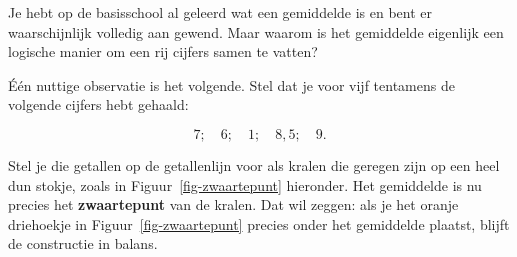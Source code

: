 \documentclass[
  a4paper,
]{scrbook}
\theoremstyle{definition}
\theoremstyle{definition}
\theoremstyle{remark}
\begin{document}
Je hebt op de basisschool al geleerd wat een gemiddelde is en bent er
waarschijnlijk volledig aan gewend. Maar waarom is het gemiddelde
eigenlijk een logische manier om een rij cijfers samen te vatten?

Één nuttige observatie is het volgende. Stel dat je voor vijf tentamens
de volgende cijfers hebt gehaald:

\[7;\quad 6;\quad 1;\quad 8{,}5;\quad 9.\]

Stel je die getallen op de getallenlijn voor als kralen die geregen zijn
op een heel dun stokje, zoals in Figuur~\ref{fig-zwaartepunt} hieronder.
Het gemiddelde is nu precies het \textbf{zwaartepunt} van de kralen. Dat
wil zeggen: als je het oranje driehoekje in Figuur~\ref{fig-zwaartepunt}
precies onder het gemiddelde plaatst, blijft de constructie in balans.
\end{document}
